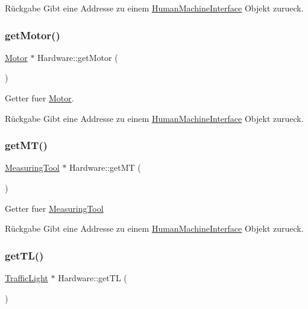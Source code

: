 \begin{DoxyReturn}{Rückgabe}
Gibt eine Addresse zu einem \hyperlink{class_human_machine_interface}{Human\+Machine\+Interface} Objekt zurueck. 
\end{DoxyReturn}
\hypertarget{class_hardware_a0a896143b14292ea1805d43e384b4fa1}{}\label{class_hardware_a0a896143b14292ea1805d43e384b4fa1} 
\subsubsection{\texorpdfstring{get\+Motor()}{getMotor()}}
{\footnotesize\ttfamily \hyperlink{class_motor}{Motor} $\ast$ Hardware\+::get\+Motor (\begin{DoxyParamCaption}{ }\end{DoxyParamCaption})}

Getter fuer \hyperlink{class_motor}{Motor}.

\begin{DoxyReturn}{Rückgabe}
Gibt eine Addresse zu einem \hyperlink{class_human_machine_interface}{Human\+Machine\+Interface} Objekt zurueck. 
\end{DoxyReturn}
\hypertarget{class_hardware_a6acc1b03b3c39ddbd681058f49e9f1bd}{}\label{class_hardware_a6acc1b03b3c39ddbd681058f49e9f1bd} 
\subsubsection{\texorpdfstring{get\+M\+T()}{getMT()}}
{\footnotesize\ttfamily \hyperlink{class_measuring_tool}{Measuring\+Tool} $\ast$ Hardware\+::get\+MT (\begin{DoxyParamCaption}{ }\end{DoxyParamCaption})}

Getter fuer \hyperlink{class_measuring_tool}{Measuring\+Tool}

\begin{DoxyReturn}{Rückgabe}
Gibt eine Addresse zu einem \hyperlink{class_human_machine_interface}{Human\+Machine\+Interface} Objekt zurueck. 
\end{DoxyReturn}
\hypertarget{class_hardware_a558325fc00a829ca20112234a961b153}{}\label{class_hardware_a558325fc00a829ca20112234a961b153} 
\subsubsection{\texorpdfstring{get\+T\+L()}{getTL()}}
{\footnotesize\ttfamily \hyperlink{class_traffic_light}{Traffic\+Light} $\ast$ Hardware\+::get\+TL (\begin{DoxyParamCaption}{ }\end{DoxyParamCaption})}

